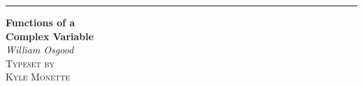 \documentclass[letter, 11pt]{book}
\begin{document}
\begin{center}
\raggedleft %
\rule{1pt}{\textheight} %
\hspace{0.05\textwidth} %
\parbox[b]{0.75\textwidth}{ %
{\Huge\bfseries Functions of a \\[0.5\baselineskip] Complex Variable }\\[2\baselineskip] %
{\Large\textit{William Osgood}}\\[4\baselineskip] %
{\large\textsc{Typeset by\\ [0.5\baselineskip] Kyle Monette}} %
\vspace{0.5\textheight} %
}
\end{center}
\end{document}
